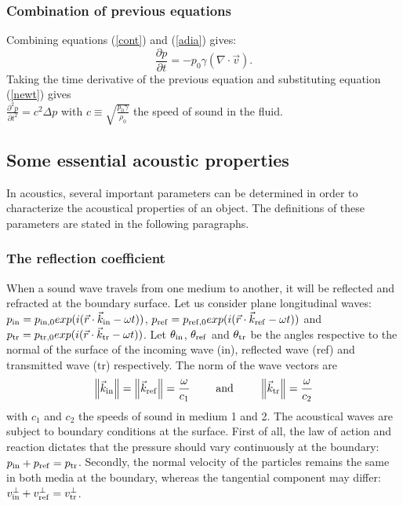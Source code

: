 \subsubsection{Combination of previous equations}
Combining equations (\ref{cont}) and (\ref{adia}) gives:
\begin{equation}
\frac{\partial p}{\partial t} = - p_0 \gamma \left(\nabla \cdot \vec{v}\right).
\label{dpdt}
\end{equation}
Taking the time derivative of the previous equation and substituting equation (\ref{newt}) gives\\
$\frac{\partial^2 p}{\partial t^2} =  c^2 \Delta p$ with $c\equiv \sqrt{\frac{p_0 \gamma}{\rho_0}}$ the speed of sound in the fluid.







\subsection{Some essential acoustic properties}
In acoustics, several important parameters can be determined in order to characterize the acoustical properties of an object. The  definitions of these parameters are stated in the following paragraphs.


\subsubsection{The reflection coefficient}
When a sound wave travels from one medium to another, it will be reflected and refracted at the boundary surface. Let us consider plane longitudinal waves:
$p_\mathrm{in} = p_\mathrm{in, 0} exp(i (\vec{r} \cdot \vec{k}_\mathrm{in} -  \omega t))$, $p_\mathrm{ref} = p_\mathrm{ref, 0} exp(i (\vec{r} \cdot \vec{k}_\mathrm{ref} -  \omega t))$ and $p_\mathrm{tr} = p_\mathrm{tr, 0} exp(i (\vec{r} \cdot \vec{k}_\mathrm{tr} -  \omega t))$. Let $\theta_\mathrm{in}$, $\theta_\mathrm{ref}$ and $\theta_\mathrm{tr}$ be the angles respective to the normal of the surface of the incoming wave (in), reflected  wave (ref) and transmitted  wave (tr) respectively. The norm of the wave vectors are 
\[
\left\|\vec{k}_\mathrm{in}\right\|
= \left\|\vec{k}_\mathrm{ref}\right\|
= \frac{\omega}{c_1}
\qquad\textrm{ and } \qquad
\left\|\vec{k}_\mathrm{tr}\right\|
= \frac{\omega}{c_2}
\]
with $c_1$ and $c_2$ the speeds of sound in medium 1 and 2. The acoustical waves are subject to boundary conditions at the surface. First of all, the law of action and reaction dictates that the pressure should vary continuously at the boundary: $p_\mathrm{in} + p_\mathrm{ref} = p_\mathrm{tr}$.
Secondly, the normal velocity of the particles remains the same in both media at the boundary, whereas the tangential component may differ: $v_\mathrm{in}^\perp + v_\mathrm{ref}^\perp = v_\mathrm{tr}^\perp$.

